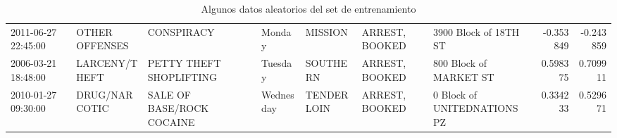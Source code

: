 \begin{table}
{\begin{tabular}{lllllllrr}
 2011-06-27 22:45:00 &   OTHER OFFENSES &                                         CONSPIRACY &     Monday &     MISSION &                    ARREST, BOOKED &        3900 Block of 18TH ST & -0.353849 & -0.243859 \\
 2006-03-21 18:48:00 &    LARCENY/THEFT &                            PETTY THEFT SHOPLIFTING &    Tuesday &    SOUTHERN &                    ARREST, BOOKED &       800 Block of MARKET ST &  0.598375 &  0.709911 \\
 2010-01-27 09:30:00 &    DRUG/NARCOTIC &                          SALE OF BASE/ROCK COCAINE &  Wednesday &  TENDERLOIN &                    ARREST, BOOKED &  0 Block of UNITEDNATIONS PZ &  0.334233 &  0.529671 \\
\bottomrule
\end{tabular}

}
\caption{Algunos datos aleatorios del set de entrenamiento}
\end{table}



